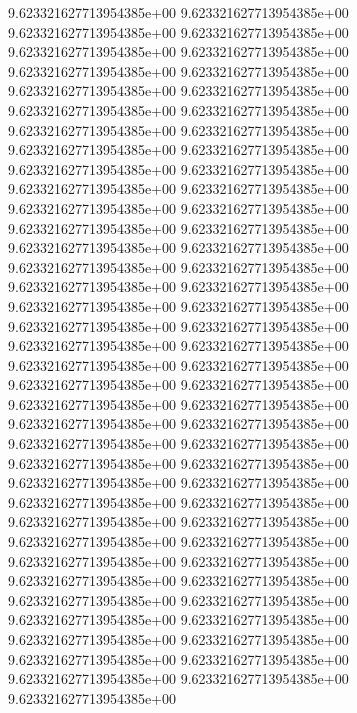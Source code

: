 9.623321627713954385e+00	9.623321627713954385e+00	9.623321627713954385e+00	9.623321627713954385e+00	9.623321627713954385e+00	9.623321627713954385e+00	9.623321627713954385e+00	9.623321627713954385e+00	9.623321627713954385e+00	9.623321627713954385e+00	9.623321627713954385e+00	9.623321627713954385e+00	9.623321627713954385e+00	9.623321627713954385e+00	9.623321627713954385e+00	9.623321627713954385e+00	9.623321627713954385e+00	9.623321627713954385e+00	9.623321627713954385e+00	9.623321627713954385e+00	9.623321627713954385e+00	9.623321627713954385e+00	9.623321627713954385e+00	9.623321627713954385e+00	9.623321627713954385e+00	9.623321627713954385e+00	9.623321627713954385e+00	9.623321627713954385e+00	9.623321627713954385e+00	9.623321627713954385e+00	9.623321627713954385e+00	9.623321627713954385e+00	9.623321627713954385e+00	9.623321627713954385e+00	9.623321627713954385e+00	9.623321627713954385e+00	9.623321627713954385e+00	9.623321627713954385e+00	9.623321627713954385e+00	9.623321627713954385e+00	9.623321627713954385e+00	9.623321627713954385e+00	9.623321627713954385e+00	9.623321627713954385e+00	9.623321627713954385e+00	9.623321627713954385e+00	9.623321627713954385e+00	9.623321627713954385e+00	9.623321627713954385e+00	9.623321627713954385e+00	9.623321627713954385e+00	9.623321627713954385e+00	9.623321627713954385e+00	9.623321627713954385e+00	9.623321627713954385e+00	9.623321627713954385e+00	9.623321627713954385e+00	9.623321627713954385e+00	9.623321627713954385e+00	9.623321627713954385e+00	9.623321627713954385e+00	9.623321627713954385e+00	9.623321627713954385e+00	9.623321627713954385e+00	9.623321627713954385e+00	9.623321627713954385e+00	9.623321627713954385e+00	9.623321627713954385e+00	9.623321627713954385e+00	9.623321627713954385e+00	9.623321627713954385e+00
